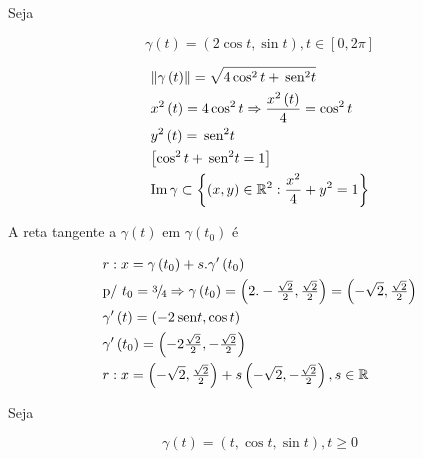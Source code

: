 \documentclass{book}
\begin{document}
\begin{ex}
Seja

\[
    \gamma \left( t \right) = \left( {2\cos t,\sin t} \right),t \in \left[ {0,2\pi } \right]
\]

\end{ex}

\begin{sol}
\[
\begin{gathered}
  \left\| {\gamma \left( t \right)} \right\| = \sqrt {4\cos ^2 t + \sin ^2 t}  \hfill \\
x^2 \left( t \right) = 4\cos ^2 t \Rightarrow \frac{{x^2 \left( t \right)}}
{4} = \cos ^2 t \hfill \\
y^2 \left( t \right) = \sin ^2 t \hfill \\
\left[ {\cos ^2 t + \sin ^2 t = 1} \right] \hfill \\
  \operatorname{Im} \gamma  \subset \left\{ {\left( {x,y} \right) \in \R^2 :\frac{{x^2 }}
{4} + y^2  = 1} \right\} \hfill \\
\end{gathered}
\]



A reta tangente a $\gamma \left( t \right)$ em $\gamma \left( t_0 \right)$ \'e

\[
\begin{gathered}
r:x = \gamma \left( {t_0 } \right) + s.\gamma '\left( {t_0 } \right) \hfill \\
{\text{p/ }}t_0  = {\raise0.5ex\hbox{$\scriptstyle 3$}
\kern-0.1em/\kern-0.15em
\lower0.25ex\hbox{$\scriptstyle 4$}} \Rightarrow \gamma \left( {t_0 } \right) = \left( {2. - \tfrac{{\sqrt 2 }}
{2},\tfrac{{\sqrt 2 }}
{2}} \right) = \left( { - \sqrt 2 ,\tfrac{{\sqrt 2 }}
{2}} \right) \hfill \\
\gamma '\left( t \right) = \left( { - 2\sin t,\cos t} \right) \hfill \\
\gamma '\left( {t_0 } \right) = \left( { - 2\tfrac{{\sqrt 2 }}
{2}, - \tfrac{{\sqrt 2 }}
{2}} \right) \hfill \\
r:x = \left( { - \sqrt 2 ,\tfrac{{\sqrt 2 }}
{2}} \right) + s\left( { - \sqrt 2 , - \tfrac{{\sqrt 2 }}
{2}} \right),s \in \R \hfill \\
\end{gathered}
\]

\end{sol}

\begin{ex}
Seja

\[
\gamma \left( t \right) = \left( {t,\cos t,\sin t} \right),t \geqslant 0
\]

\end{ex}
\end{document}
